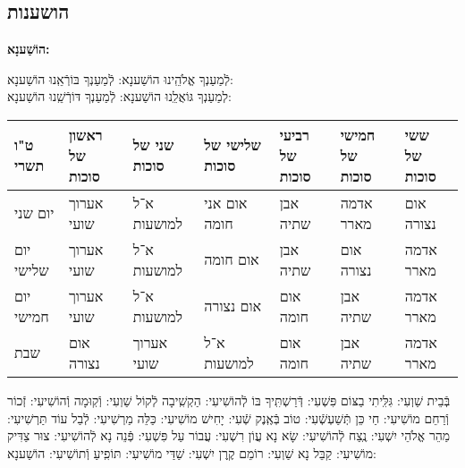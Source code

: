 \documentclass[twoside, openany, parskip=half, 11pt]{book}
\begin{document}
\begin{sometimes}


\chapter[הושענות]{ הושענות }
\label{hoshanos}


\begin{Large}
\textbf{
הוֹשַׁענָא:
}
 \end{Large}


 לְֿמַעַנְךָ אֱלֹהֵֽינוּ הוֹשַׁענָא: לְֿמַעַנְךָ בּוֹרְֿאֵֽנוּ הוֹשַׁענָא:\\
לְמַעַנְךָ גּוֹאֲלֵֽנוּ הוֹשַׁענָא: לְֿמַעַנְךָ דּוֹרְֿשֵֽׁנוּ הוֹשַׁענָא:

\begin{tiny}
\begin{tabular}{>{\centering\arraybackslash}m{}||>{\centering\arraybackslash}m{}|>{\centering\arraybackslash}m{}|>{\centering\arraybackslash}m{}|>{\centering\arraybackslash}m{}|>{\centering\arraybackslash}m{}|>{\centering\arraybackslash}m{}}
ט"ו תשרי & ראשון של סוכות & שני של סוכות & שלישי של סוכות & רביעי של סוכות & חמישי של סוכות & ששי של סוכות \\
\hline \hline
יום שני & אערוך שועי & א־ל למושעות & אום אני חומה & אבן שתיה & אדמה מארר & אום נצורה\\ \hline
יום שלישי & אערוך שועי & א־ל למושעות & אום חומה & אבן שתיה & אום נצורה & אדמה מארר \\ \hline
יום חמישי & אערוך שועי & א־ל למושעות & אום נצורה & אום חומה & אבן שתיה & אדמה מארר\\ \hline
שבת & אום נצורה & אערוך שועי & א־ל למושעות & אום חומה & אבן שתיה & אדמה מארר
\end{tabular}

\end{tiny}


בְּֿבֵית שַׁוְעִי: גִּלִּֽיתִי בַצּוֹם פִּשְׁעִי: דְּֿרַשְׁתִּֽיךָ בּוֹ לְֿהוֹשִׁיעִי: הַקְשִֽׁיבָה לְֿקוֹל שַׁוְעִי: וְֿקֽוּמָה וְֿהוֹשִׁיעִי: זְֿכוֹר וְֿרַחֵם מוֹשִׁיעִי: חַי כֵּן תְּֿשַׁעְשְֿׁעִי: טוֹב בְּֿאֶֽנֶק שְֿׁעִי: יָחִישׁ מוֹשִׁיעִי: כַּלֵּה מַרְשִׁיעִי: לְֿבַל עוֹד תַּרְשִׁיעִי: מַהֵר אֱלֹהֵי יִשְׁעִי: נֶֽצַח לְֿהוֹשִׁיעִי: שָׂא נָא עֲוֹן רִשְׁעִי: עֲבוֹר עַל פִּשְׁעִי: פְּֿנֵה נָא לְֿהוֹשִׁיעִי: צוּר צַדִּיק מוֹשִׁיעִי: קַבֵּל נָא שַׁוְעִי: רוֹמֵם קֶֽרֶן יִשְׁעִי:
 שַׁדַּי מוֹשִׁיעִי: תּוֹפִֽיעַ וְֿתוֹשִׁיעִי: הוֹשַׁענָא:



\end{sometimes}
\end{document}
